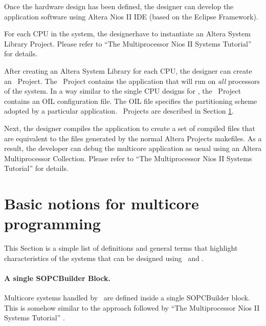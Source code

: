 Once the hardware design has been defined, the designer can develop
the application software using Altera Nios II IDE (based on the Eclipse
Framework).

For each CPU in the system, the designerhave to instantiate an Altera System
Library Project. Please refer to ``The
Multiprocessor Nios II Systems Tutorial'' \cite{Altera-multicpu-tutorial}
for details.

After creating an Altera System Library for each CPU, the designer can
create an \rtd\ Project. The \rtd\ Project contains the application
that will run on {\em all} processors of the system. In a way similar
to the single CPU designs for \ee, the \rtd\ Project contains an OIL
configuration file. The OIL file \cite{OSEKOIL} specifies the
partitioning scheme adopted by a particular application. \rtd\
Projects are described in Section \ref{sec:niosII-basic-notions}.

Next, the designer compiles the application to create a set of
compiled files that are equivalent to the files generated by the
normal Altera Projects makefiles. As a result, the developer can debug
the multicore application as usual using an Altera Multiprocessor
Collection. Please refer to ``The Multiprocessor Nios II Systems
Tutorial'' \cite{Altera-multicpu-tutorial} for details.















\section[Basic notions]{Basic notions for multicore programming}
\label{sec:niosII-basic-notions}

This Section is a simple list of definitions and general terms that
highlight characteristics of the systems that can be designed
using \rtd\ and \ee.

\paragraph{A single SOPCBuilder Block.}
Multicore systems handled by \ee\ are defined inside
a single SOPCBuilder block. This is somehow similar to the approach
followed by ``The Multiprocessor Nios II Systems Tutorial''
\cite{Altera-multicpu-tutorial}.

